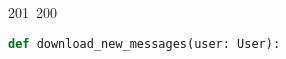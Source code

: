 201~200~\documentclass{article}
\begin{document}
	                                                                                                                                                                                                                                                                                                	                                                                                                                                        	    	                                                                                                	                                                                                            \begin{lstlisting}[language=Python, caption=Download new messages]
	                                                                                                                                                                                                                                                                                                	                                                                                                                                        	    	                                                                                                	                                                                                            def download_new_messages(user: User):
	                                                                                                                                                                                                                                                                                                	                                                                                                                                        	    	                                                                                                	                                                                                                """
	                                                                                                                                                                                                                                                                                                	                                                                                                                                        	    	                                                                                                	                                                                                                    \brief Download new messages for a user.

\end{lstlisting}
\end{document}
